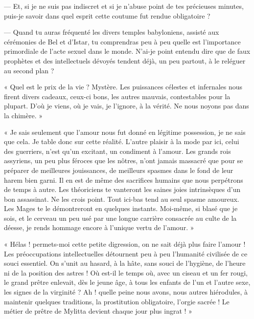 \documentclass[a4paper, 11pt, oneside, polutonikogreek, french]{article}
\begin{document}
--- Et, si je ne suis pas indiscret et si je n'abuse point de tes précieuses minutes, puis-je savoir dans quel esprit cette coutume fut rendue obligatoire ?

\bigskip
\centerline{\EightStarTaper}
\centerline{\EightStarTaper\EightStarTaper}
\bigskip

--- Quand tu auras fréquenté les divers temples babyloniens, assisté aux cérémonies de Bel et d'Istar, tu comprendras peu à peu quelle est l'importance primordiale de l'acte sexuel dans le monde. N'ai-je point entendu dire que de faux prophètes et des intellectuels dévoyés tendent déjà, un peu partout, à le reléguer au second plan ?

« Quel est le prix de la vie ? Mystère. Les puissances célestes et infernales nous firent divers cadeaux, ceux-ci bons, les autres mauvais, contestables pour la plupart. D'où je viens, où je vais, je l'ignore, à la vérité. Ne nous noyons pas dans la chimère. »

« Je sais seulement que l'amour nous fut donné en légitime possession, je ne sais que cela. Je table donc sur cette réalité. L'autre plaisir à la mode par ici, celui des guerriers, n'est qu'un excitant, un condiment à l'amour. Les grands rois assyriens, un peu plus féroces que les nôtres, n'ont jamais massacré que pour se préparer de meilleures jouissances, de meilleurs spasmes dans le fond de leur harem bien garni. Il en est de même des sacrifices humains que nous perpétrons de temps à autre. Les théoriciens te vanteront les saines joies intrinsèques d'un bon assassinat. Ne les crois point. Tout ici-bas tend au seul spasme amoureux. Les Mages te le démontreront en quelques instants. Moi-même, si blasé que je sois, et le cerveau un peu usé par une longue carrière consacrée au culte de la déesse, je rends hommage encore à l'unique vertu de l'amour. »

« Hélas ! permets-moi cette petite digression, on ne sait déjà plus faire l'amour ! Les préoccupations intellectuelles détournent peu à peu l'humanité civilisée de ce souci essentiel. On s'unit au hasard, à la hâte, sans souci de l'hygiène, de l'heure ni de la position des astres ! Où est-il le temps où, avec un ciseau et un fer rougi, le grand prêtre enlevait, dès le jeune âge, à tous les enfants de l'un et l'autre sexe, les signes de la virginité ? Ah ! quelle peine nous avons, nous autres hiérodules, à maintenir quelques traditions, la prostitution obligatoire, l'orgie sacrée ! Le métier de prêtre de Mylitta devient chaque jour plus ingrat ! »
\end{document}
